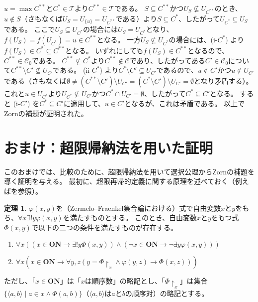 ﻿\documentclass{ltjsarticle}
\theoremstyle{definition}
\newtheorem{theorem}{定理}
\begin{document}
$u = \max C^{**}$と$C^* \in \mathcal{T}$より$C^{**} \in \mathcal{T}$である。
$S \subseteq C^{**}$かつ$U_S \not\subseteq U_{C^{**}}$のとき、$u \not\in S$（さもなくば$U_S = U_{\{u\}} = U_{C^{**}}$である）より$S \subseteq C^*$、したがって$U_{C^*} \subseteq U_S$である。
ここで$U_S \subseteq U_{C^*}$の場合には$U_S = U_{C^*}$となり、$f(U_S) = f(U_{C^*}) = u \in C^{**}$となる。
一方$U_S \not\subseteq U_{C^*}$の場合には、(i-$C^*$) より$f(U_S) \in C^* \subseteq C^{**}$となる。
いずれにしても$f(U_S) \in C^{**}$となるので、$C^{**} \in \mathcal{C}_0$である。
$C^{**} \not\subseteq C^*$より$C^{**} \not\in \mathcal{C}$であり、したがってある$C' \in \mathcal{C}_0$について$C^{**} \setminus C' \not\subseteq U_{C'}$である。
(ii-$C^*$) より$C^* \setminus C' \subseteq U_{C'}$であるので、$u \not\in C'$かつ$u \not\in U_{C'}$である（さもなくば$\emptyset \neq (C^{**} \setminus C') \setminus U_{C'} = (C^* \setminus C') \setminus U_{C'} = \emptyset$となり矛盾する）。
これと$u \in U_{C^*}$より$U_{C^*} \not\subseteq U_{C'}$かつ$C^* \cap U_{C'} = \emptyset$、したがって$C^* \subseteq C'$となる。
すると (i-$C'$) を$C^* \subseteq C'$に適用して、$u \in C'$となるが、これは矛盾である。
以上でZornの補題が証明された。


\section*{おまけ：超限帰納法を用いた証明}

このおまけでは、比較のために、超限帰納法を用いて選択公理からZornの補題を導く証明を与える。
最初に、超限再帰的定義に関する原理を述べておく（例えば\cite[第I章定理9.3]{Kunen}を参照）。

\begin{theorem}
    \label{thm:transfinite_induction}
    $\varphi(x,y)$を（Zermelo--Fraenkel集合論における）式で自由変数$x$と$y$をもち、$\forall x \exists! y \varphi(x,y)$を満たすものとする。
    このとき、自由変数$x$と$y$をもつ式$\Phi(x,y)$で以下の二つの条件を満たすものが存在する。
    \begin{enumerate}
        \item $\forall x ( (x \in \mathbf{ON} \to \exists! y \Phi(x,y)) \land (\neg x \in \mathbf{ON} \to \neg\exists y \varphi(x,y) ) )$
        \item $\forall x ( x \in \mathbf{ON} \to \forall y,z ( y = \Phi\!\upharpoonright_x \land \varphi(y,z) \to \Phi(x,z) ) )$
    \end{enumerate}
    ただし、「$x \in \mathbf{ON}$」は「$x$は順序数」の略記とし、「$\Phi\!\upharpoonright_x$」は集合$\{\langle a,b \rangle \mid a \in x \land \Phi(a,b)\}$（$\langle a,b \rangle$は$a$と$b$の順序対）の略記とする。
\end{theorem}
\end{document}
